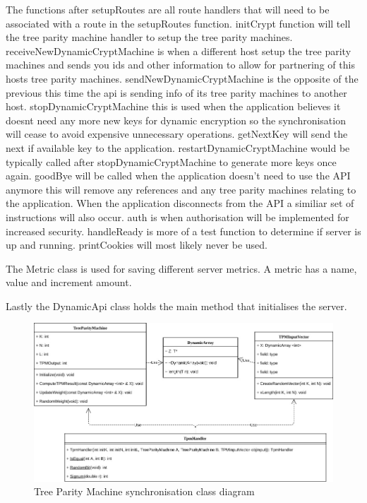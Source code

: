 The functions after setupRoutes are all route handlers that will need to be associated with a route in the setupRoutes function. initCrypt function will tell the tree parity machine handler to setup the tree parity machines. receiveNewDynamicCryptMachine is when a different host setup the tree parity machines and sends you ids and other information to allow for partnering of this hosts tree parity machines. sendNewDynamicCryptMachine is the opposite of the previous this time the api is sending info of its tree parity machines to another host. stopDynamicCryptMachine this is used when the application believes it doesnt need any more new keys for dynamic encryption so the synchronisation will cease to avoid expensive unnecessary operations. getNextKey will send the next if available key to the application. restartDynamicCryptMachine would be typically called after stopDynamicCryptMachine to generate more keys once again. goodBye will be called when the application doesn't need to use the API anymore this will remove any references and any tree parity machines relating to the application. When the application disconnects from the API a similiar set of instructions will also occur. auth is when authorisation will be implemented for increased security. handleReady is more of a test function to determine if server is up and running. printCookies will most likely never be used. 

The Metric class is used for saving different server metrics. A metric has a name, value and increment amount.

Lastly the DynamicApi class holds the main method that initialises the server.





\begin{figure}[!h]
  \centering
      \includegraphics[width=1\textwidth]{Figures/TreeParityMachine.jpg}
  \caption[Tree Parity Machine synchronisation class diagram]{Tree Parity Machine synchronisation class diagram}
  \label{fig:tpmClassDiagram}
\end{figure}

